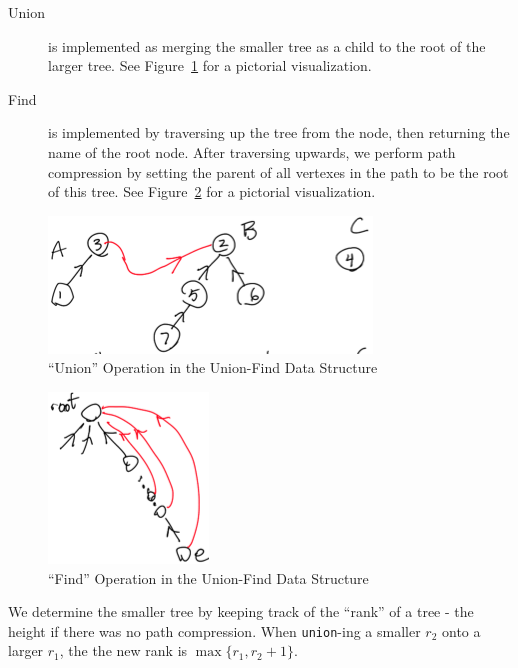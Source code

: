                     \begin{description}
                        \item[Union] is implemented as merging the smaller tree as a child to the root of the larger tree.
                            See Figure~\ref{fig:union_find_union} for a pictorial visualization.
                        \item[Find] is implemented by traversing up the tree from the node, then returning the name of the root node.
                            After traversing upwards, we perform path compression by setting the parent of all vertexes in the path to be the root of this tree.
                            See Figure~\ref{fig:union_find_find} for a pictorial visualization.
                    \end{description}
                    \begin{figure}[h]
                        \centering
                        \includegraphics{images/union_find_union.png}
                        \caption{``Union'' Operation in the Union-Find Data Structure}
                        \label{fig:union_find_union}
                    \end{figure}
                    \begin{figure}[h]
                        \centering
                        \includegraphics{images/union_find_find.png}
                        \caption{``Find'' Operation in the Union-Find Data Structure}
                        \label{fig:union_find_find}
                    \end{figure}
                    We determine the smaller tree by keeping track of the ``rank'' of a tree - the height if there was no path compression.
                    When \verb|union|-ing a smaller $r_2$ onto a larger $r_1$, the the new rank is $\max\{r_1, r_2+1\}$.
